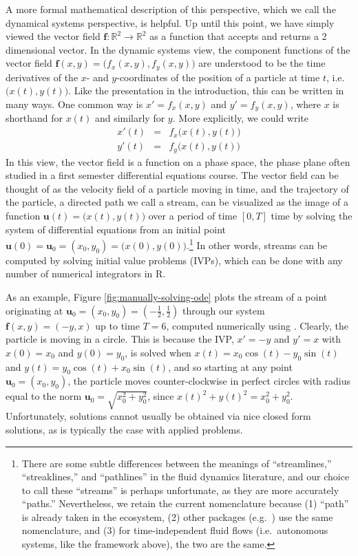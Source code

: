 A more formal mathematical description of this perspective, which we call the dynamical systems perspective, is helpful. Up until this point, we have simply viewed the vector field \(\mathbf{f}: \mathbb{R}^{2} \to \mathbb{R}^{2}\) as a function that accepts and returns a 2 dimensional vector. In the dynamic systems view, the component functions of the vector field \(\mathbf{f}(x,y) = \big(f_{x}(x,y), f_{y}(x,y)\big)\) are understood to be the time derivatives of the \(x\)- and \(y\)-coordinates of the position of a particle at time \(t\), i.e.~\(\big(x(t),y(t)\big)\). Like the presentation in the introduction, this can be written in many ways. One common way is \(x' = f_{x}(x,y)\) and \(y' = f_{y}(x,y)\), where \(x\) is shorthand for \(x(t)\) and similarly for \(y\). More explicitly, we could write
\begin{eqnarray*}
x'(t) &=& f_{x}\big(x(t),y(t)\big) \\
y'(t) &=& f_{y}\big(x(t),y(t)\big)
\end{eqnarray*}
In this view, the vector field is a function on a phase space, the phase plane often studied in a first semester differential equations course. The vector field can be thought of as the velocity field of a particle moving in time, and the trajectory of the particle, a directed path we call a stream, can be visualized as the image of a function \(\mathbf{u}(t) = \big(x(t),y(t)\big)\) over a period of time \([0,T]\) time by solving the system of differential equations from an initial point \(\mathbf{u}(0) = \mathbf{u}_{0} = (x_{0},y_{0}) = \big(x(0), y(0)\big)\).\footnote{There are some subtle differences between the meanings of ``streamlines,'' ``streaklines,'' and ``pathlines'' in the fluid dynamics literature, and our choice to call these ``streams'' is perhaps unfortunate, as they are more accurately ``paths.'' Nevertheless, we retain the current nomenclature because (1) ``path'' is already taken in the  ecosystem, (2) other packages (e.g.~) use the same nomenclature, and (3) for time-independent fluid flows (i.e.~autonomous systems, like the framework above), the two are the same.} In other words, streams can be computed by solving initial value problems (IVPs), which can be done with any number of numerical integrators in R.

As an example, Figure \ref{fig:manually-solving-ode} plots the stream of a point originating at \(\mathbf{u}_{0} = (x_{0},y_{0}) = (-\frac{1}{2}, \frac{1}{2})\) through our system \(\mathbf{f}(x,y) = (-y,x)\) up to time \(T = 6\), computed numerically using  \citep{deSolve-paper,deSolve-book}. Clearly, the particle is moving in a circle. This is because the IVP, \(x' = -y\) and \(y' = x\) with \(x(0) = x_{0}\) and \(y(0) = y_{0}\), is solved when \(x(t) = x_{0}\cos(t) - y_{0}\sin(t)\) and \(y(t) = y_{0}\cos(t) + x_{0}\sin(t)\), and so starting at any point \(\mathbf{u}_{0} = (x_{0}, y_{0})\), the particle moves counter-clockwise in perfect circles with radius equal to the norm \(\mathbf{u}_{0} = \sqrt{x_{0}^{2} + y_{0}^{2}}\), since \(x(t)^2 + y(t)^2 = x_{0}^{2} + y_{0}^{2}\). Unfortunately, solutions cannot usually be obtained via nice closed form solutions, as is typically the case with applied problems.

